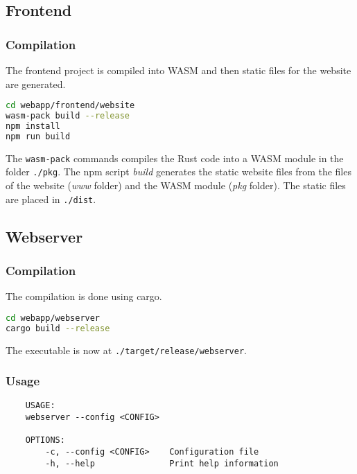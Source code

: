 \documentclass[../documentation.tex]{subfiles}
\begin{document}
\subsection{Frontend}

\subsubsection{Compilation}

The frontend project is compiled into WASM and then
static files for the website are generated.

\begin{lstlisting}[language=bash]
cd webapp/frontend/website
wasm-pack build --release
npm install
npm run build
\end{lstlisting}

The \texttt{wasm-pack} commands compiles the Rust code into
a WASM module in the folder \texttt{./pkg}.
The npm script \textit{build} generates the static website files
from the files of the website (\textit{www} folder)
and the WASM module (\textit{pkg} folder).
The static files are placed in \texttt{./dist}.

\subsection{Webserver}

\subsubsection{Compilation}

The compilation is done using cargo.

\begin{lstlisting}[language=bash]
cd webapp/webserver
cargo build --release
\end{lstlisting}

The executable is now at \texttt{./target/release/webserver}.

\subsubsection{Usage}

\begin{lstlisting}
    USAGE:
    webserver --config <CONFIG>

    OPTIONS:
        -c, --config <CONFIG>    Configuration file
        -h, --help               Print help information
\end{lstlisting}
\end{document}
